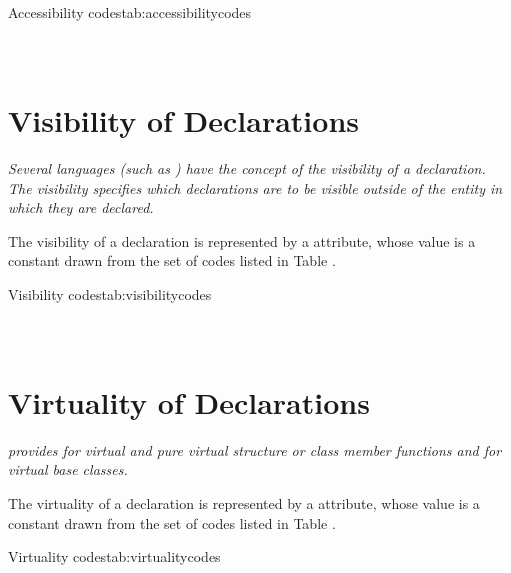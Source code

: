 \begin{simplenametable}[1.9in]{Accessibility codes}{tab:accessibilitycodes}
\DWACCESSpublicTARG{}          \\
\DWACCESSprivateTARG{}        \\
\DWACCESSprotectedTARG{}    \\
\end{simplenametable}

\section{Visibility of Declarations}
\label{chap:visibilityofdeclarations}

\textit{Several languages (such as )
have the concept of the visibility of a declaration. The
visibility specifies which declarations are to be
visible outside of the entity in which they are
declared.}

The\hypertarget{chap:DWATvisibilityvisibilityofdeclaration}{}
visibility of a declaration is represented
by a \DWATvisibilityDEFN{}
attribute, whose value is a
constant drawn from the set of codes listed in
Table .

\begin{simplenametable}[1.5in]{Visibility codes}{tab:visibilitycodes}
\DWVISlocalTARG{}          \\
\DWVISexportedTARG{}    \\
\DWVISqualifiedTARG{}  \\
\end{simplenametable}

\section{Virtuality of Declarations}
\label{chap:virtualityofdeclarations}
\textit{ provides for virtual and pure virtual structure or class
member functions and for virtual base classes.}

The\hypertarget{chap:DWATvirtualityvirtualityindication}{}
virtuality of a declaration is represented by a
\DWATvirtualityDEFN{}
attribute, whose value is a constant drawn
from the set of codes listed in
Table .

\begin{simplenametable}[2.5in]{Virtuality codes}{tab:virtualitycodes}
\DWVIRTUALITYnoneTARG{}                      \\
\DWVIRTUALITYvirtualTARG{}                \\
\DWVIRTUALITYpurevirtualTARG{}    \\
\end{simplenametable}

